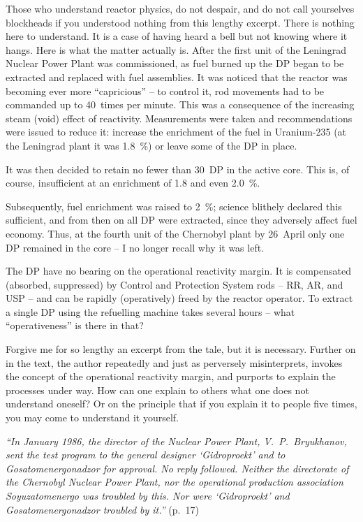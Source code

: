 \documentclass[openright]{bookest}
\begin{document}
Those who understand reactor physics, do not despair, and do not call yourselves blockheads if you understood nothing from this lengthy excerpt. There is nothing here to understand. It is a case of having heard a bell but not knowing where it hangs. Here is what the matter actually is. After the first unit of the Leningrad Nuclear Power Plant was commissioned, as fuel burned up the DP began to be extracted and replaced with fuel assemblies. It was noticed that the reactor was becoming ever more ``capricious'' -- to control it, rod movements had to be commanded up to 40~times per minute. This was a consequence of the increasing steam (void) effect of reactivity. Measurements were taken and recommendations were issued to reduce it: increase the enrichment of the fuel in Uranium-235 (at the Leningrad plant it was \qty{1.8}{\percent}) or leave some of the DP in place.

It was then decided to retain no fewer than \num{30}~DP in the active core. This is, of course, insufficient at an enrichment of \num{1.8} and even \qty{2.0}{\percent}.

Subsequently, fuel enrichment was raised to \qty{2}{\percent}; science blithely declared this sufficient, and from then on all DP were extracted, since they adversely affect fuel economy. Thus, at the fourth unit of the Chernobyl plant by 26~April only one DP remained in the core -- I no longer recall why it was left.

The DP have no bearing on the operational reactivity margin. It is compensated (absorbed, suppressed) by Control and Protection System rods -- RR, AR, and USP -- and can be rapidly (operatively) freed by the reactor operator. To extract a single DP using the refuelling machine takes several hours -- what ``operativeness'' is there in that?

Forgive me for so lengthy an excerpt from the tale, but it is necessary. Further on in the text, the author repeatedly and just as perversely misinterprets, invokes the concept of the operational reactivity margin, and purports to explain the processes under way. How can one explain to others what one does not understand oneself? Or on the principle that if you explain it to people five times, you may come to understand it yourself.

\begin{personal}
\textit{``In January 1986, the director of the Nuclear Power Plant, V.~P.~Bryukhanov, sent the test program to the general designer `Gidroproekt' and to Gosatomenergonadzor for approval. No reply followed. Neither the directorate of the Chernobyl Nuclear Power Plant, nor the operational production association Soyuzatomenergo was troubled by this. Nor were `Gidroproekt' and Gosatomenergonadzor troubled by it.''} (p.~17)
\end{personal}
\end{document}

